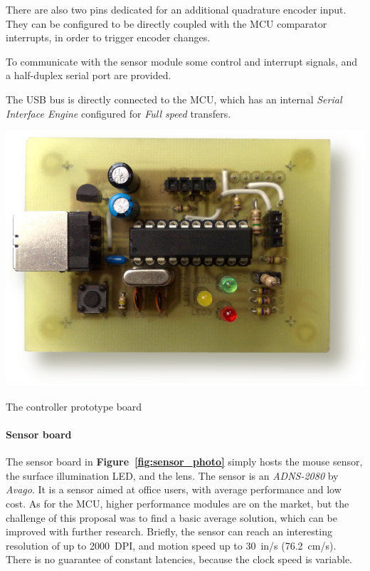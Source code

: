 \documentclass[a4paper,10pt]{article}
\makeatletter
\newenvironment{figurehere}{\def\@captype{figure}\vspace{2ex}}{\vspace{2ex}}
\newcommand{\citef}[1]{\textbf{Figure~\ref{#1}}}
\makeatother
\begin{document}
\begin{multicols}{2}
There are also two pins dedicated for an additional quadrature encoder input.
They can be configured to be directly coupled with the MCU comparator
interrupts, in order to trigger encoder changes.

To communicate with the sensor module some control and interrupt signals, and
a half-duplex serial port are provided.

The USB bus is directly connected to the MCU, which has an internal
\emph{Serial Interface Engine} configured for \emph{Full speed} transfers.

\begin{figurehere}
	\centering
	\includegraphics[keepaspectratio=true,width=\columnwidth]{images/board_photo.jpg}
	\caption{The controller prototype board}
	\label{fig:board_photo}
\end{figurehere}


\paragraph{Sensor board}
The sensor board in \citef{fig:sensor_photo} simply hosts the mouse sensor,
the surface illumination LED, and the lens. The sensor is an \emph{ADNS-2080}
\cite{avago_adns2080} by \emph{Avago}. It is a sensor aimed at office users,
with average performance and low cost. As for the MCU, higher performance
modules are on the market, but the challenge of this proposal was to find a
basic average solution, which can be improved with further research. Briefly,
the sensor can reach an interesting resolution of up to 2000~DPI, and motion
speed up to 30~in/s (76.2~cm/s). There is no guarantee of constant latencies,
because the clock speed is variable.


\end{multicols}
\end{document}

